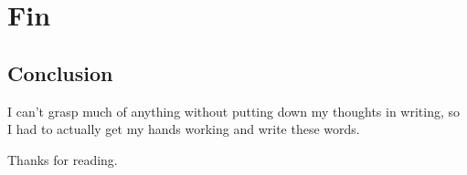 
\part*{Fin}


\chapter{Conclusion}

\epigraph{I can't grasp much of anything without putting down my thoughts in writing, so I had to actually get my hands working and write these words.}{\textcite{murakami2008}}


Thanks for reading.